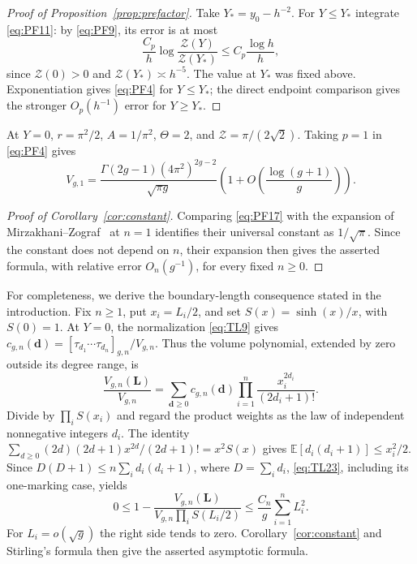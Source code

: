 \begin{proof}[Proof of Proposition~\ref{prop:prefactor}]
Take $Y_*=y_0-h^{-2}$. For $Y\le Y_*$ integrate \eqref{eq:PF11}:
by \eqref{eq:PF9}, its error is at most
\[
 \frac{C_p}{h}\log\frac{\mathcal Z(Y)}{\mathcal Z(Y_*)}
 \le C_p\frac{\log h}{h},
\]
since $\mathcal Z(0)>0$ and
$\mathcal Z(Y_*)\asymp h^{-5}$. The value at $Y_*$ was fixed above.
Exponentiation gives \eqref{eq:PF4} for $Y\le Y_*$; the direct endpoint
comparison gives the stronger $O_p(h^{-1})$ error for $Y\ge Y_*$.
\end{proof}

At $Y=0$, $r=\pi^2/2$, $A=1/\pi^2$, $\Theta=2$, and
$\mathcal Z=\pi/(2\sqrt2)$. Taking $p=1$ in \eqref{eq:PF4} gives
\begin{equation}
 V_{g,1}=\frac{\Gamma(2g-1)(4\pi^2)^{2g-2}}{\sqrt{\pi g}}
 \left(1+O\!\left(\frac{\log(g+1)}g\right)\right).
 \label{eq:PF17}
\end{equation}
\begin{proof}[Proof of Corollary~\ref{cor:constant}]
Comparing \eqref{eq:PF17} with the expansion of
Mirzakhani--Zograf~\cite[Theorem~1.2 and Remark~1.3]{MZ} at $n=1$
identifies their universal constant as $1/\sqrt\pi$. Since the constant
does not depend on $n$, their expansion then gives the asserted formula,
with relative error $O_n(g^{-1})$, for every fixed $n\ge0$.
\end{proof}

For completeness, we derive the boundary-length consequence stated in the
introduction. Fix $n\ge1$, put $x_i=L_i/2$, and set $S(x)=\sinh(x)/x$,
with $S(0)=1$. At $Y=0$, the normalization \eqref{eq:TL9} gives
$c_{g,n}(\mathbf d)=[\tau_{d_1}\cdots\tau_{d_n}]_{g,n}/V_{g,n}$.
Thus the volume polynomial, extended by zero outside its degree range, is
\[
 \frac{V_{g,n}(\mathbf L)}{V_{g,n}}
 =\sum_{\mathbf d\ge0}c_{g,n}(\mathbf d)
   \prod_{i=1}^n\frac{x_i^{2d_i}}{(2d_i+1)!}.
\]
Divide by $\prod_i S(x_i)$ and regard the product weights as the law of
independent nonnegative integers $d_i$. The identity
$\sum_{d\ge0}(2d)(2d+1)x^{2d}/(2d+1)!=x^2S(x)$ gives
$\mathbb E[d_i(d_i+1)]\le x_i^2/2$. Since
$D(D+1)\le n\sum_i d_i(d_i+1)$, where $D=\sum_i d_i$,
\eqref{eq:TL23}, including its one-marking case, yields
\begin{equation}
 0\le 1-\frac{V_{g,n}(\mathbf L)}{V_{g,n}\prod_i S(L_i/2)}
 \le \frac{C_n}{g}\sum_{i=1}^n L_i^2.
 \label{eq:boundary-factor}
\end{equation}
For $L_i=o(\sqrt g)$ the right side tends to zero. Corollary~\ref{cor:constant}
and Stirling's formula then give the asserted asymptotic formula.
